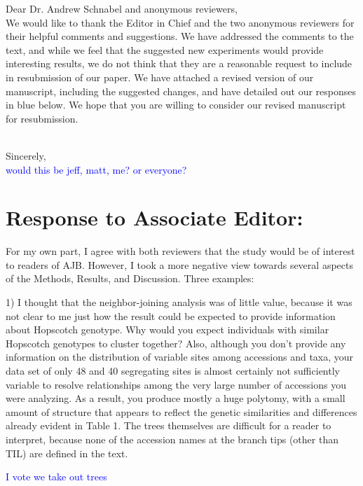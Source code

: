 \documentclass[11pt]{article}
\newcommand{\res}[1]{\noindent \textcolor{blue}{{#1}} \\}
\begin{document}
\noindent Dear Dr. Andrew Schnabel and anonymous reviewers, \\

We would like to thank the Editor in Chief and the two anonymous reviewers for their helpful comments and suggestions. We have addressed the comments to the text, and while we feel that the suggested new experiments would provide interesting results, we do not think that they are a reasonable request to include in resubmission of our paper.  We have attached a revised version of our manuscript, including the suggested changes, and have detailed out our responses in blue below. We hope that you are willing to consider our revised manuscript for resubmission.\\\

\noindent Sincerely,\\

\res{would this be jeff, matt, me? or everyone?}


\section*{Response to Associate Editor:}

For my own part, I agree with both reviewers that the study would be of interest to readers of AJB.  However, I took a more negative view towards several aspects of the Methods, Results, and Discussion.  Three examples:

1) I thought that the neighbor-joining analysis was of little value, because it was not clear to me just how the result could be expected to provide information about Hopscotch genotype.  Why would you expect individuals with similar Hopscotch genotypes to cluster together?  Also, although you don’t provide any information on the distribution of variable sites among accessions and taxa, your data set of only 48 and 40 segregating sites is almost certainly not sufficiently variable to resolve relationships among the very large number of accessions you were analyzing.  As a result, you produce mostly a huge polytomy, with a small amount of structure that appears to reflect the genetic similarities and differences already evident in Table 1.  The trees themselves are difficult for a reader to interpret, because none of the accession names at the branch tips (other than TIL) are defined in the text.

\res{I vote we take out trees}
\end{document}
